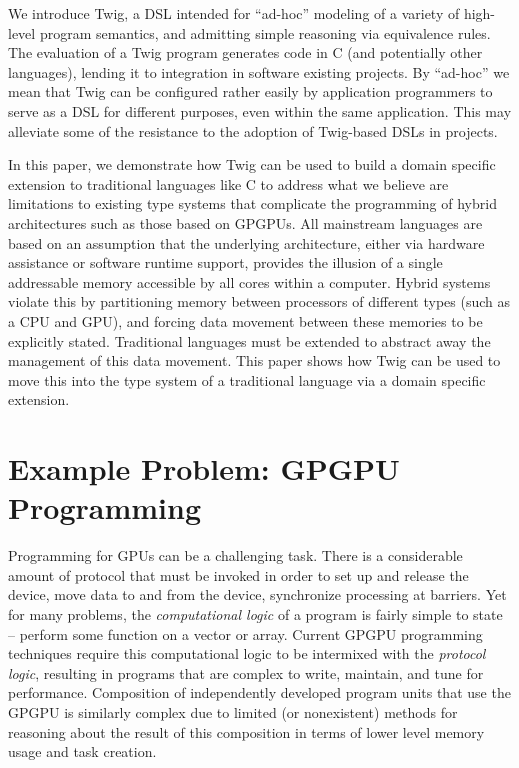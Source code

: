 \documentclass[11pt]{article}
\begin{document}
We introduce Twig, a DSL intended for ``ad-hoc'' modeling of a variety of
high-level program semantics, and admitting simple reasoning via equivalence
rules. The evaluation of a Twig program generates code in C (and potentially
other languages), lending it to integration in software existing projects. By
``ad-hoc'' we mean that Twig can be configured rather easily by application
programmers to serve as a DSL for different purposes, even within the same
application. This may alleviate some of the resistance to the adoption of
Twig-based DSLs in projects. 

In this paper, we demonstrate how Twig can be used to build a domain specific
extension to traditional languages like C to address what we believe are
limitations to existing type systems that complicate the programming of
hybrid architectures such as those based on GPGPUs.  All mainstream
languages are based on an assumption that the underlying architecture, either
via hardware assistance or software runtime support, provides the illusion
of a single addressable memory accessible by all cores within a computer.
Hybrid systems violate this by partitioning memory between processors of 
different types (such as a CPU and GPU), and forcing data movement between
these memories to be explicitly stated.  Traditional languages must be
extended to abstract away the management of this data movement.  This paper
shows how Twig can be used to move this into the type system of a traditional
language via a domain specific extension.  %

\section{Example Problem: GPGPU Programming}

Programming for GPUs can be a challenging task. There is a considerable amount
of protocol that must be invoked in order to set up and release the device,
move data to and from the device, synchronize processing at barriers. Yet for
many problems, the \emph{computational logic} of a program is fairly simple to
state -- perform some function on a vector or array. Current GPGPU programming
techniques require this computational logic to be intermixed with the
\emph{protocol logic}, resulting in programs that are complex to write,
maintain, and tune for performance. Composition of independently developed
program units that use the GPGPU is similarly complex due to limited (or
nonexistent) methods for reasoning about the result of this composition in
terms of lower level memory usage and task creation.
\end{document}
